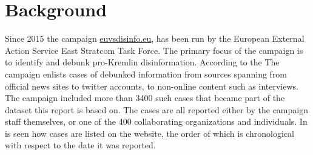 \documentclass{article}
\begin{document}
\section{Background}
Since 2015 the campaign \url{euvsdisinfo.eu}, has been run by the European External Action Service East Stratcom Task Force. The primary focus of the campaign is to identify and debunk pro-Kremlin disinformation. According to the 
The campaign enlists cases of debunked information from sources spanning from official news sites to twitter accounts, to non-online content such as interviews. The campaign included more than 3400 such cases that became part of the dataset this report is based on. The cases are all reported either by the campaign staff themselves, or one of the 400 collaborating organizations and individuals.
In  is seen how cases are listed on the website, the order of which is chronological with respect to the date it was reported.
\end{document}
